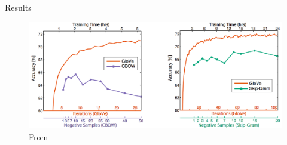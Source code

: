 \begin{frame}{Results}
  \begin{figure}
    \includegraphics[scale=0.27]{images/gloveVSword2vec.png}
    \caption{From}
  \end{figure}
\end{frame}

